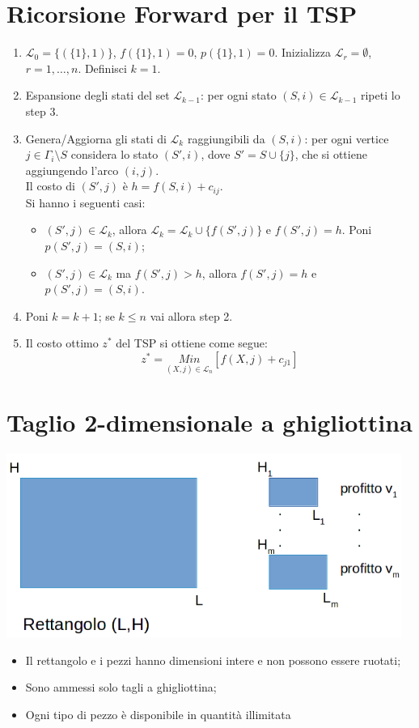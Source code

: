 \section{Ricorsione Forward per il TSP}
\begin{enumerate}
	\item $\mathscr{L}_{0}=\{(\{1\},1)\}$, $f(\{1\},1)=0$, $p(\{1\},1)=0$. Inizializza $\mathscr{L}_{r}=\emptyset$, $r=1,\dots,n$. Definisci $k=1$.
	\item Espansione degli stati del set $\mathscr{L}_{k-1}$: per ogni stato $(S,i)\in\mathscr{L}_{k-1}$ ripeti lo step 3.
	\item Genera/Aggiorna gli stati di $\mathscr{L}_{k}$ raggiungibili da $(S,i)$: per ogni vertice $j\in\Gamma_{i}\setminus S$ considera lo stato $(S',i)$, dove $S'=S\cup\{j\}$, che si ottiene aggiungendo l'arco $(i,j)$.\\
	Il costo di $(S',j)$ è $h=f(S,i)+c_{ij}$.\\
	Si hanno i seguenti casi:
	\begin{itemize}
		\item $(S',j)\in\mathscr{L}_{k}$, allora $\mathscr{L}_{k}=\mathscr{L}_{k}\cup \{f(S',j)\}$ e $f(S',j)=h$. Poni $p(S',j)=(S,i)$;
		\item $(S',j)\in\mathscr{L}_{k}$ ma $f(S',j)>h$, allora $f(S',j)=h$ e $p(S',j)=(S,i)$.
	\end{itemize}
	\item Poni $k=k+1$; se $k\le n$ vai allora step 2.
	\item Il costo ottimo $z^{*}$ del TSP si ottiene come segue:
	\begin{equation*}
		z^{*}=\underset{(X,j)\in\mathscr{L}_{n}}{Min}[f(X,j)+c_{j1}]
	\end{equation*}
\end{enumerate}

\section{Taglio 2-dimensionale a ghigliottina}
\centerline{\includegraphics[height=6cm]{images/shape1.png}}
\begin{itemize}
	\item Il rettangolo e i pezzi hanno dimensioni intere e non possono essere ruotati;
	\item Sono ammessi solo tagli a ghigliottina;
	\item Ogni tipo di pezzo è disponibile in quantità illimitata
\end{itemize}

